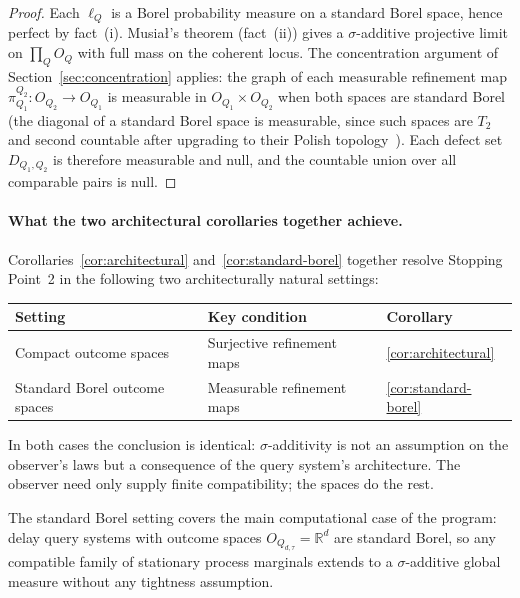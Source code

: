 \begin{proof}
Each $\ell_Q$ is a Borel probability measure on a standard Borel
space, hence perfect by fact~(i).  Musia{\l}'s theorem (fact~(ii))
gives a $\sigma$-additive projective limit on $\prod_Q O_Q$ with
full mass on the coherent locus.  The concentration argument of
Section~\ref{sec:concentration} applies: the graph of each
measurable refinement map $\pi^{Q_2}_{Q_1}: O_{Q_2} \to O_{Q_1}$
is measurable in $O_{Q_1} \times O_{Q_2}$ when both spaces are
standard Borel (the diagonal of a standard Borel space is
measurable, since such spaces are $T_2$ and second countable after
upgrading to their Polish topology~\cite{Srivastava1998}).  Each
defect set $D_{Q_1,Q_2}$ is therefore measurable and null, and
the countable union over all comparable pairs is null.
\end{proof}

\paragraph{What the two architectural corollaries together achieve.}
Corollaries~\ref{cor:architectural} and~\ref{cor:standard-borel}
together resolve Stopping Point~2 in the following two architecturally
natural settings:

\begin{center}
\begin{tabular}{lll}
\toprule
Setting & Key condition & Corollary \\
\midrule
Compact outcome spaces & Surjective refinement maps & \ref{cor:architectural} \\
Standard Borel outcome spaces & Measurable refinement maps & \ref{cor:standard-borel} \\
\bottomrule
\end{tabular}
\end{center}

In both cases the conclusion is identical: $\sigma$-additivity is not
an assumption on the observer's laws but a consequence of the query
system's architecture.  The observer need only supply finite
compatibility; the spaces do the rest.

The standard Borel setting covers the main computational case of the
program: delay query systems with outcome spaces $O_{Q_{d,\tau}}
= \mathbb{R}^d$ are standard Borel, so any compatible family of
stationary process marginals extends to a $\sigma$-additive global
measure without any tightness assumption.


